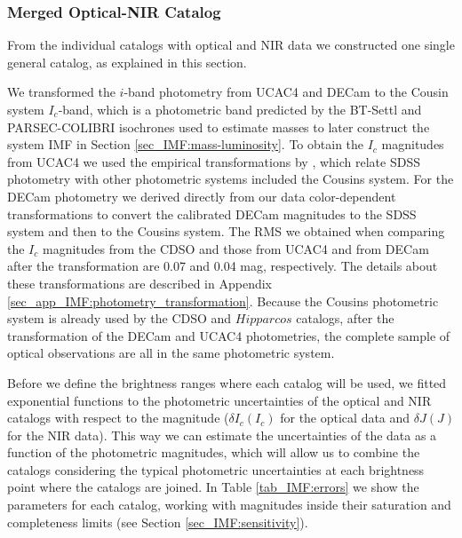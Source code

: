\documentclass[12pt]{article}
\newcounter{subsubsubsection}[subsubsection]
\begin{document}
\subsubsection{Merged Optical-NIR Catalog}
\label{sec_IMF:merged_cat}

From the individual catalogs with optical and NIR data we constructed one single general catalog, as explained in this section.

\label{sec_IMF:photometry_transformation}
We transformed the $i$-band photometry from UCAC4 and DECam to the Cousin system $I_c$-band, which is a photometric band predicted by the BT-Settl \citep{Baraffe2015} and \ac{PARSEC-COLIBRI} \citep{Marigo2017} isochrones used to estimate masses to later construct the system IMF in Section \ref{sec_IMF:mass-luminosity}. To obtain the $I_c$ magnitudes from UCAC4 we used the empirical transformations by \citet{Jordi2006}, which relate SDSS photometry with other photometric systems included the Cousins system. For the DECam photometry we derived directly from our data color-dependent transformations to convert the calibrated DECam magnitudes to the SDSS system and then to the Cousins system. The RMS we obtained when comparing the $I_c$ magnitudes from the CDSO and those from UCAC4 and from DECam after the transformation are 0.07 and 0.04 mag, respectively. The details about these transformations are described in Appendix \ref{sec_app_IMF:photometry_transformation}. Because the Cousins photometric system is already used by the CDSO and $Hipparcos$ catalogs, after the transformation of the DECam and UCAC4 photometries, the complete sample of optical observations are all in the same photometric system.

\label{sec_IMF:photometry_uncertainties}
Before we define the brightness ranges where each catalog will be used, we fitted exponential functions to the photometric uncertainties of the optical and NIR catalogs with respect to the magnitude ($\delta I_c(I_c)$ for the optical data and $\delta J(J)$ for the NIR data). This way we can estimate the uncertainties of the data as a function of the photometric magnitudes, which will allow us to combine the catalogs considering the typical photometric uncertainties at each brightness point where the catalogs are joined. In Table \ref{tab_IMF:errors} we show the parameters for each catalog, working with magnitudes inside their saturation and completeness limits (see Section \ref{sec_IMF:sensitivity}).
\end{document}
